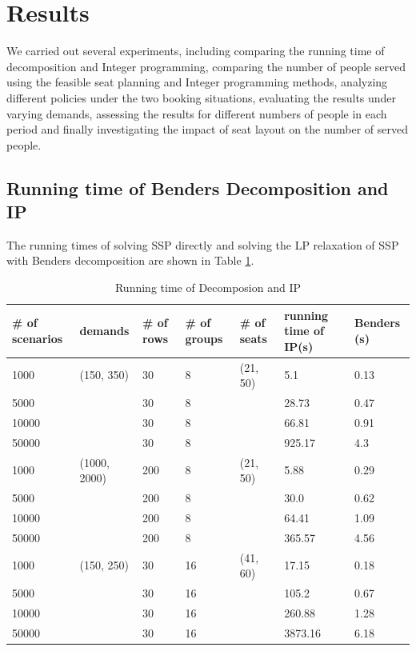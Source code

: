 \section{Results}
We carried out several experiments, including comparing the running time of decomposition and Integer programming, comparing the number of people served using the feasible seat planning and Integer programming methods, analyzing different policies under the two booking situations, evaluating the results under varying demands, assessing the results for different numbers of people in each period and finally investigating the impact of seat layout on the number of served people.

\subsection{Running time of Benders Decomposition and IP}\label{Bender_IP}

The running times of solving SSP directly and solving the LP relaxation of SSP with Benders decomposition are shown in Table \ref{tab_1}.

\begin{table}[ht]
  \centering
  \scriptsize
  \caption{Running time of Decomposion and IP}\label{tab_1}
  \begin{tabular}{|l|l|l|l|l|l|l|}
  \hline
  \# of scenarios & demands & \# of rows & \# of groups & \# of seats & running time of IP(s) & Benders (s) \\
  \hline
  1000  & (150, 350) & 30 & 8 & (21, 50) & 5.1  & 0.13 \\
  5000  &            & 30 & 8 &         & 28.73 & 0.47  \\
  10000 &            & 30 & 8 &         & 66.81  & 0.91 \\
  50000 &            & 30 & 8 &         & 925.17 & 4.3 \\
  \hline
  1000  & (1000, 2000) & 200 & 8 & (21, 50) & 5.88 & 0.29 \\
  5000  &              & 200 & 8 &          & 30.0 & 0.62 \\
  10000 &              & 200 & 8 &          & 64.41 & 1.09 \\
  50000 &              & 200 & 8 &          & 365.57 & 4.56\\
  \hline
  1000  & (150, 250) & 30 & 16 & (41, 60) & 17.15  & 0.18 \\
  5000  &            & 30 & 16 &          & 105.2  & 0.67 \\
  10000 &            & 30 & 16 &          & 260.88 & 1.28 \\
  50000 &            & 30 & 16 &          & 3873.16 & 6.18 \\
  \hline
  \end{tabular}
\end{table}

